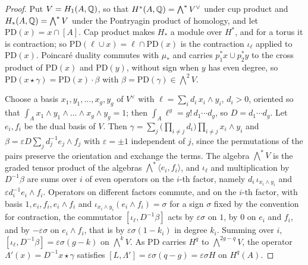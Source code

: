 \begin{proof}
Put $V=H_{1}(A,\mathbb{Q})$, so that $H^{*}(A,\mathbb{Q})=\bigwedge^{*}V^{\vee}$ under cup
product and $H_{*}(A,\mathbb{Q})=\bigwedge^{*}V$ under the Pontryagin product of
homology, and let $\mathrm{PD}(x)=x\cap[A]$. Cap product makes
$H_{*}$ a module over $H^{*}$, and for a torus it is contraction; so
$\mathrm{PD}(\ell\cup x)=\ell\cap\mathrm{PD}(x)$ is the contraction
$\iota_{\ell}$ applied to $\mathrm{PD}(x)$. Poincar\'e duality commutes
with $\mu_{*}$ and carries $p_{1}^{*}x\cup p_{2}^{*}y$ to the cross product
of $\mathrm{PD}(x)$ and $\mathrm{PD}(y)$, without sign when $y$ has even
degree, so $\mathrm{PD}(x\star\gamma)=\mathrm{PD}(x)\cdot\beta$ with
$\beta=\mathrm{PD}(\gamma)\in\bigwedge^{2}V$.

Choose a basis $x_{1},y_{1},\dots,x_{g},y_{g}$ of $V^{\vee}$ with
$\ell=\sum_{i}d_{i}\,x_{i}\wedge y_{i}$, $d_{i}>0$, oriented so that
$\int_{A}x_{1}\wedge y_{1}\wedge\dots\wedge x_{g}\wedge y_{g}=1$; then
$\int_{A}\ell^{g}=g!\,d_{1}\cdots d_{g}$, so $D=d_{1}\cdots d_{g}$. Let
$e_{i},f_{i}$ be the dual basis of $V$. Then
$\gamma=\sum_{j}\bigl(\prod_{i\ne j}d_{i}\bigr)\prod_{i\ne j}x_{i}\wedge y_{i}$
and $\beta=\varepsilon D\sum_{j}d_{j}^{-1}e_{j}\wedge f_{j}$ with
$\varepsilon=\pm1$ independent of $j$, since the permutations of the pairs
preserve the orientation and exchange the terms. The algebra $\bigwedge^{*}V$
is the graded tensor product of the algebras
$\bigwedge^{*}\langle e_{i},f_{i}\rangle$, and $\iota_{\ell}$ and
multiplication by $D^{-1}\beta$ are sums over $i$ of even operators on the
$i$-th factor, namely $d_{i}\,\iota_{x_{i}\wedge y_{i}}$ and
$\varepsilon d_{i}^{-1}e_{i}\wedge f_{i}$. Operators on different factors
commute, and on the $i$-th factor, with basis $1,e_{i},f_{i},e_{i}\wedge
f_{i}$ and $\iota_{x_{i}\wedge y_{i}}(e_{i}\wedge f_{i})=\sigma$ for a sign
$\sigma$ fixed by the convention for contraction, the commutator
$[\iota_{\ell},D^{-1}\beta]$ acts by $\varepsilon\sigma$ on $1$, by $0$ on
$e_{i}$ and $f_{i}$, and by $-\varepsilon\sigma$ on $e_{i}\wedge f_{i}$, that
is by $\varepsilon\sigma(1-k_{i})$ in degree $k_{i}$. Summing over $i$,
$[\iota_{\ell},D^{-1}\beta]=\varepsilon\sigma(g-k)$ on $\bigwedge^{k}V$. As
$\mathrm{PD}$ carries $H^{q}$ to $\bigwedge^{2g-q}V$, the operator
$\Lambda'(x)=D^{-1}x\star\gamma$ satisfies
$[L,\Lambda']=\varepsilon\sigma(q-g)=\varepsilon\sigma H$ on $H^{q}(A)$.


\end{proof}
